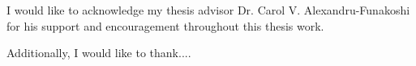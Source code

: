 
\begin{acknowledgements}
I would like to acknowledge my thesis advisor Dr. Carol V. Alexandru-Funakoshi
for his support and encouragement throughout this thesis work.

Additionally, I would like to thank....


\end{acknowledgements}
